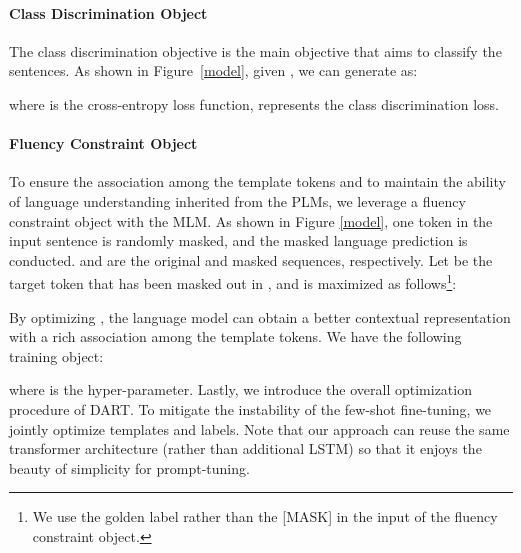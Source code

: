 \documentclass{article} \usepackage{iclr2022_conference,times}
\begin{document}
\paragraph{Class Discrimination Object} 
The class discrimination objective is the main objective that aims to classify the sentences.
As shown in Figure~\ref{model}, given , we can generate  as: 

where  is the cross-entropy loss function,   represents the class discrimination loss.

\paragraph{Fluency Constraint Object}
 
To ensure the association among the template tokens and to maintain the ability of language understanding inherited from the PLMs, we leverage a fluency constraint object with the MLM. 
As shown in Figure \ref{model}, one token in the input sentence is randomly masked, and the masked language prediction is conducted.
 and  are the original and masked sequences, respectively. 
Let  be the target token that has been masked out in , and  is maximized as follows\footnote{We use the golden label  rather than the [MASK] in the input of the fluency constraint object.}:
 




By optimizing , the language model can obtain a better contextual representation with a rich association among the template tokens. 
We have the following training object:


where  is the hyper-parameter. 
Lastly, we introduce the overall optimization procedure of DART. 
To mitigate the instability of the few-shot fine-tuning, we jointly optimize templates and labels. 
Note that our approach can reuse the same transformer architecture (rather than additional LSTM) so that it enjoys the beauty of simplicity for prompt-tuning.



\iffalse
\begin{algorithm}[h]
  \caption{Differentiable Prompt Fine-tuning Algorithm with Two-stage Optimization} \label{alg}
  \begin{algorithmic}[1]
    \Require
        : stochastic objective function with parameters ;
        ,: learning rate;
        : parameters of the templates and label tokens;  
    
    \State initialize ;
    \While{ not converged} \Comment{Template and label optimization with learning rate }
        \label{alg:iteration1}
        \State  ; 
        \State  ;
        \State  ;
    \EndWhile

    \label{alg:iteration11}
    \While{ not converged} \Comment{All parameter optimization with learning rate }
        \label{alg:iteration2} 
        \State  ;
        \State ;
        \State ;
    \EndWhile
    \label{alg:iteration22}

  \end{algorithmic}
\end{algorithm}
\fi
\end{document}
